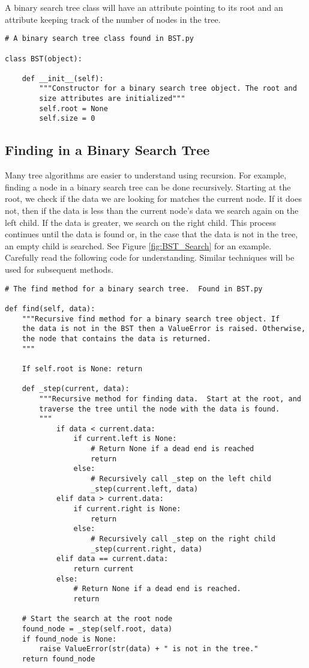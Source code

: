 A binary search tree class will have an attribute pointing to its root and an attribute keeping track of the number of nodes in the tree.

\begin{lstlisting}
# A binary search tree class found in BST.py

class BST(object):

	def __init__(self):
		"""Constructor for a binary search tree object. The root and
		size attributes are initialized"""
		self.root = None
		self.size = 0

\end{lstlisting}


\subsection*{Finding in a Binary Search Tree}

Many tree algorithms are easier to understand using recursion.
For example, finding a node in a binary search tree can be done recursively.
Starting at the root, we check if the data we are looking for matches the current node.
If it does not, then if the data is less than the current node's data we search again on the left child.
If the data is greater, we search on the right child.
This process continues until the data is found or, in the case that the data is not in the tree, an empty child is searched.
See Figure \ref{fig:BST_Search} for an example.
Carefully read the following code for understanding.
Similar techniques will be used for subsequent methods.

\begin{lstlisting}
# The find method for a binary search tree.  Found in BST.py

def find(self, data):
	"""Recursive find method for a binary search tree object. If
	the data is not in the BST then a ValueError is raised. Otherwise,
	the node that contains the data is returned.
	"""

	If self.root is None: return

	def _step(current, data):
		"""Recursive method for finding data.  Start at the root, and 
		traverse the tree until the node with the data is found.
		"""
			if data < current.data:
				if current.left is None:
					# Return None if a dead end is reached
					return
				else:
					# Recursively call _step on the left child
					_step(current.left, data)
			elif data > current.data:
				if current.right is None:
					return
				else:
					# Recursively call _step on the right child
					_step(current.right, data)
			elif data == current.data:
				return current
			else:
				# Return None if a dead end is reached.
				return

	# Start the search at the root node
	found_node = _step(self.root, data)
	if found_node is None:
		raise ValueError(str(data) + " is not in the tree."
	return found_node
\end{lstlisting}


